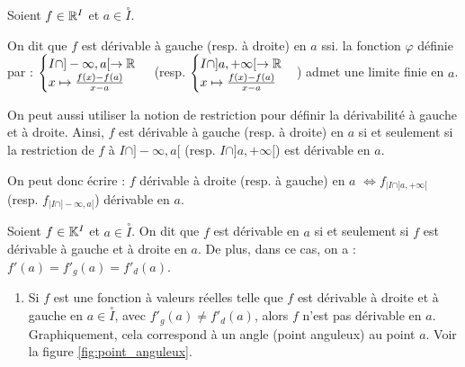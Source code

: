 \documentclass[12pt, a4paper]{report}
\begin{document}
\begin{definition}
    Soient $f \in \mathbb{R}^I$ et $a \in \overset{\circ}{I}$.
    
    On dit que $f$ est dérivable à gauche (resp. à droite) en $a$ ssi. la fonction $\varphi$ définie par : $\begin{cases}I\cap]-\infty,a[\to\mathbb{R}\\x\mapsto \frac{f(x)-f(a)}{x-a}\end{cases}$ (resp. $\begin{cases}I\cap]a,+\infty[\to\mathbb{R}\\x\mapsto \frac{f(x)-f(a)}{x-a}\end{cases}$) admet une limite finie en $a$.

    On peut aussi utiliser la notion de restriction pour définir la dérivabilité à gauche et à droite. Ainsi, $f$ est dérivable à gauche (resp. à droite) en $a$ si et seulement si la restriction de $f$ à $I\cap]-\infty,a[$ (resp. $I\cap]a,+\infty[$) est dérivable en $a$. 
    
    On peut donc écrire : $f$ dérivable à droite (resp. à gauche) en $a$ $\iff f_{|I\cap]a,+\infty[}$ (resp. $f_{|I\cap]-\infty,a[}$) dérivable en $a$.
\end{definition}

\begin{property}
    Soient $f \in \mathbb{K}^I$ et $a \in \overset{\circ}{I}$. On dit que $f$ est dérivable en $a$ si et seulement si $f$ est dérivable à gauche et à droite en $a$. De plus, dans ce cas, on a : $f'(a) = f'_{g}(a) = f'_{d}(a)$.
\end{property}

\begin{remark}
    \begin{enumerate}
        \item Si $f$ est une fonction à valeurs réelles telle que $f$ est dérivable à droite et à gauche en $a \in \overset{\circ}{I}$, avec $f'_{g}(a) \neq f'_{d}(a)$, alors $f$ n'est pas dérivable en $a$.\\Graphiquement, cela correspond à un angle (point anguleux) au point $a$. Voir la figure \ref{fig:point_anguleux}.
    \end{enumerate}
\end{remark}
\end{document}
